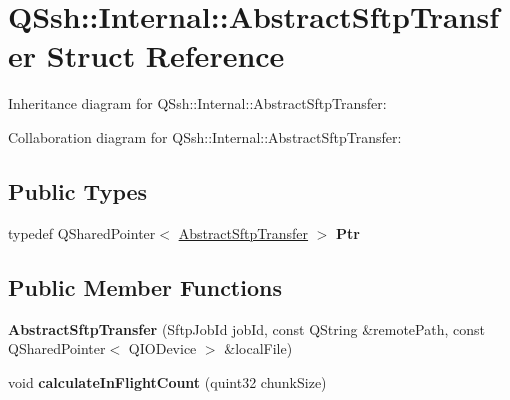 \hypertarget{struct_q_ssh_1_1_internal_1_1_abstract_sftp_transfer}{}\section{Q\+Ssh\+:\+:Internal\+:\+:Abstract\+Sftp\+Transfer Struct Reference}
\label{struct_q_ssh_1_1_internal_1_1_abstract_sftp_transfer}


Inheritance diagram for Q\+Ssh\+:\+:Internal\+:\+:Abstract\+Sftp\+Transfer\+:


Collaboration diagram for Q\+Ssh\+:\+:Internal\+:\+:Abstract\+Sftp\+Transfer\+:
\subsection*{Public Types}
\begin{DoxyCompactItemize}
\item 
\mbox{\label{struct_q_ssh_1_1_internal_1_1_abstract_sftp_transfer_ab264a692934a9b5e389aa5cd165f9fa2}} 
typedef Q\+Shared\+Pointer$<$ \mbox{\hyperlink{struct_q_ssh_1_1_internal_1_1_abstract_sftp_transfer}{Abstract\+Sftp\+Transfer}} $>$ {\bfseries Ptr}
\end{DoxyCompactItemize}
\subsection*{Public Member Functions}
\begin{DoxyCompactItemize}
\item 
\mbox{\label{struct_q_ssh_1_1_internal_1_1_abstract_sftp_transfer_ad23758868bb7112897a8eceb3fcddedd}} 
{\bfseries Abstract\+Sftp\+Transfer} (Sftp\+Job\+Id job\+Id, const Q\+String \&remote\+Path, const Q\+Shared\+Pointer$<$ Q\+I\+O\+Device $>$ \&local\+File)
\item 
\mbox{\label{struct_q_ssh_1_1_internal_1_1_abstract_sftp_transfer_a31e22afdd97d261491f80434b6b8ffea}} 
void {\bfseries calculate\+In\+Flight\+Count} (quint32 chunk\+Size)
\end{DoxyCompactItemize}
